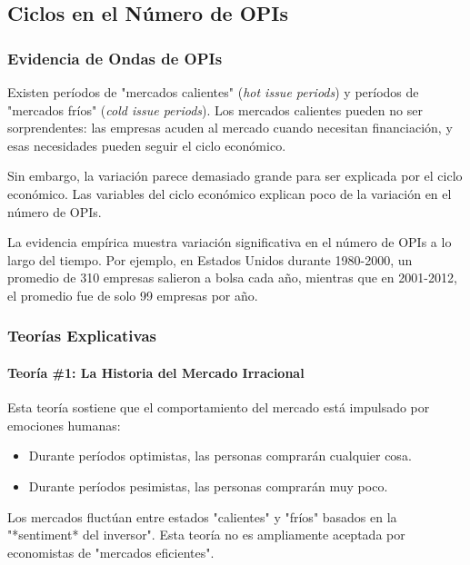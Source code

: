 \subsection{Ciclos en el Número de OPIs}

\subsubsection{Evidencia de Ondas de OPIs}

Existen períodos de "mercados calientes" (\textit{hot issue periods}) y períodos de "mercados fríos" (\textit{cold issue periods}). Los mercados calientes pueden no ser sorprendentes: las empresas acuden al mercado cuando necesitan financiación, y esas necesidades pueden seguir el ciclo económico.

\begin{proposicion}
Sin embargo, la variación parece demasiado grande para ser explicada por el ciclo económico. Las variables del ciclo económico explican poco de la variación en el número de OPIs.
\end{proposicion}

La evidencia empírica muestra variación significativa en el número de OPIs a lo largo del tiempo. Por ejemplo, en Estados Unidos durante 1980-2000, un promedio de 310 empresas salieron a bolsa cada año, mientras que en 2001-2012, el promedio fue de solo 99 empresas por año.

\subsubsection{Teorías Explicativas}

\paragraph{Teoría \#1: La Historia del Mercado Irracional}

\begin{proposicion}
Esta teoría sostiene que el comportamiento del mercado está impulsado por emociones humanas:
\begin{itemize}
\item Durante períodos optimistas, las personas comprarán cualquier cosa.
\item Durante períodos pesimistas, las personas comprarán muy poco.
\end{itemize}
Los mercados fluctúan entre estados "calientes" y "fríos" basados en la "*sentiment* del inversor". Esta teoría no es ampliamente aceptada por economistas de "mercados eficientes".
\end{proposicion}

